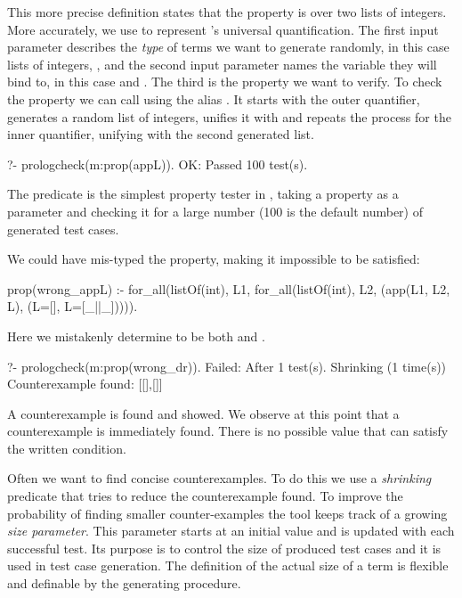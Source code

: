 This more precise definition states that the property  is 
over two lists of integers.
%
More accurately, we use  to represent \plqc{}'s universal quantification.
%
The first input parameter describes the \emph{type} of terms we want to
generate randomly, in this case lists of integers,
, 
and the second input parameter names the variable they will bind to, in this case
 and .
%
The third is the property we want to verify.
%
To check the property we can call \plqc{} using the alias
.
%
It starts with the outer  quantifier, generates a random
list of integers, unifies it with  and repeats the process for
the inner quantifier, unifying  with the second generated list.
%
\begin{yapcode}
   ?- prologcheck(m:prop(appL)).
 OK: Passed 100 test(s).
\end{yapcode}
%
The  predicate is the simplest property tester in
\plqc{}, taking a property as a parameter and checking it for a large
number (100 is the default number) of generated test cases.
%


We could have mis-typed the property, making it impossible to be satisfied:
%
\begin{yapcode}
 prop(wrong_appL) :- for_all(listOf(int), L1,
   for_all(listOf(int), L2, (app(L1, L2, L), (L=[], L=[_||_])))).
\end{yapcode}
%
Here we mistakenly determine  to be both  \yap{[]} and  \yap{[_||_]}.
%
\begin{yapcode}
   ?- prologcheck(m:prop(wrong_dr)).
 Failed: After 1 test(s).
 Shrinking (1 time(s))
 Counterexample found: [[],[]]
\end{yapcode}
A counterexample is found and showed.
%
We observe at this point that a counterexample is immediately found.
%
There is no possible value that can satisfy the written condition.
%


Often we want to find concise counterexamples.
%
To do this we use a \emph{shrinking} predicate that tries to reduce the
counterexample found.
%
To improve the probability of finding smaller counter-examples the tool
keeps track of a growing \emph{size parameter}.
%
This parameter  starts at an initial value and is updated with each
successful test.
%
Its purpose is to control the size of produced test cases and it is used
in test case generation.
%
The definition of the actual size of a term is flexible and definable by
the generating procedure. 


